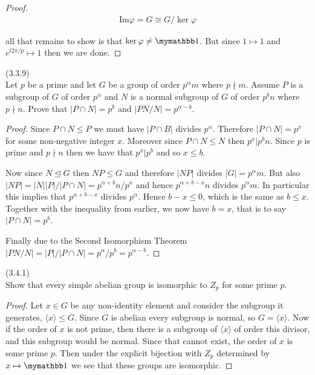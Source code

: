 \documentclass{exam}
\begin{document}
\begin{questions}
\begin{proof}
  \begin{align*}
    \text{Im}\varphi=G\cong G/\ker\varphi
  \end{align*}

  all that remains to show is that $\ker\varphi\ne \mymathbb 1$. But since $1\mapsto 1$ and $e^{i2\pi/p}\mapsto 1$ then we are done.
  \end{proof}

\question(3.3.9)\\
Let $p$ be a prime and let $G$ be a group of order $p^\alpha m$ where $p\nmid m$.  Assume $P$ is a subgroup of $G$ of order $p^\alpha$ and $N$ is a normal subgroup of $G$ of order $p^bn$ where $p\nmid n$.  Prove that $|P\cap N|=p^b$ and $|PN/N|=p^{\alpha-b}$.

\begin{proof}
  Since $P\cap N\leq P$ we must have $|P\cap B|$ divides $p^\alpha$.  Therefore $|P\cap N|=p^x$ for some non-negative integer $x$.  Moreover since $P\cap N \leq N$ then $p^{x}|p^{b}n$.  Since $p$ is prime and $p\nmid n$ then we have that $p^x | p^b$ and so $x \leq b$.

  Now since $N\trianglelefteq G$ then $NP \leq G$ and therefore $|NP|$ divides $|G|=p^\alpha m$.  But also $|NP|=|N||P|/|P\cap N|=p^{\alpha+b}n/p^x$ and hence $p^{\alpha+b-x}n$ divides $p^\alpha m$.  In particular this implies that $p^{\alpha+b-x}$ divides $p^\alpha$.  Hence $b-x\leq 0$, which is the same as $b\leq x$.  Together with the inequality from earlier, we now have $b=x$, that is to say $|P\cap N|=p^b$.

  Finally due to the Second Isomorphism Theorem $|PN/N| = |P|/|P\cap N|=p^\alpha / p^b = p^{\alpha-b}$.
\end{proof}

\question(3.4.1)\\
Show that every simple abelian group is isomorphic to $Z_p$ for some prime $p$.

\begin{proof}
  Let $x\in G$ be any non-identity element and consider the subgroup it generates, $\langle x\rangle \leq G$.  Since $G$ is abelian every subgroup is normal, so $G = \langle x\rangle$.  Now if the order of $x$ is not prime, then there is a subgroup of $\langle x\rangle$ of order this divisor, and this subgroup would be normal.  Since that cannot exist, the order of $x$ is some prime $p$.  Then under the explicit bijection with $Z_p$ determined by $x\mapsto \mymathbb 1$ we see that these groups are isomorphic.
\end{proof}


\end{questions}
\end{document}
